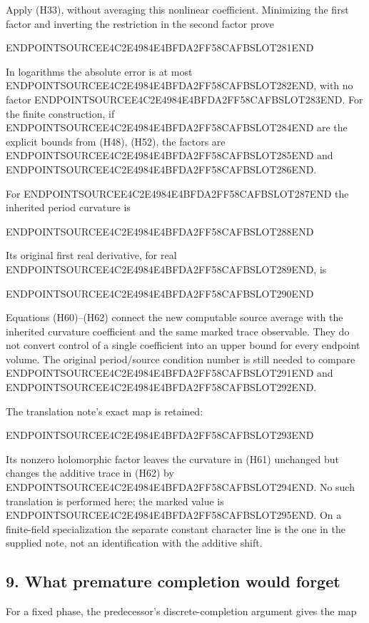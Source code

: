 Apply (H33), without averaging this nonlinear coefficient. Minimizing the first factor and inverting the restriction in the second factor prove

ENDPOINTSOURCEE4C2E4984E4BFDA2FF58CAFBSLOT281END

In logarithms the absolute error is at most ENDPOINTSOURCEE4C2E4984E4BFDA2FF58CAFBSLOT282END, with no factor ENDPOINTSOURCEE4C2E4984E4BFDA2FF58CAFBSLOT283END. For the finite construction, if ENDPOINTSOURCEE4C2E4984E4BFDA2FF58CAFBSLOT284END are the explicit bounds from (H48), (H52), the factors are ENDPOINTSOURCEE4C2E4984E4BFDA2FF58CAFBSLOT285END and ENDPOINTSOURCEE4C2E4984E4BFDA2FF58CAFBSLOT286END.

For ENDPOINTSOURCEE4C2E4984E4BFDA2FF58CAFBSLOT287END the inherited period curvature is

ENDPOINTSOURCEE4C2E4984E4BFDA2FF58CAFBSLOT288END

Its original first real derivative, for real ENDPOINTSOURCEE4C2E4984E4BFDA2FF58CAFBSLOT289END, is

ENDPOINTSOURCEE4C2E4984E4BFDA2FF58CAFBSLOT290END

Equations (H60)--(H62) connect the new computable source average with the inherited curvature coefficient and the same marked trace observable. They do not convert control of a single coefficient into an upper bound for every endpoint volume. The original period/source condition number is still needed to compare ENDPOINTSOURCEE4C2E4984E4BFDA2FF58CAFBSLOT291END and ENDPOINTSOURCEE4C2E4984E4BFDA2FF58CAFBSLOT292END.

The translation note's exact map is retained:

ENDPOINTSOURCEE4C2E4984E4BFDA2FF58CAFBSLOT293END

Its nonzero holomorphic factor leaves the curvature in (H61) unchanged but changes the additive trace in (H62) by ENDPOINTSOURCEE4C2E4984E4BFDA2FF58CAFBSLOT294END. No such translation is performed here; the marked value is ENDPOINTSOURCEE4C2E4984E4BFDA2FF58CAFBSLOT295END. On a finite-field specialization the separate constant character line is the one in the supplied note, not an identification with the additive shift.

\subsection{9. What premature completion would forget}\label{endpoint-holonomy_original--what-premature-completion-would-forget}

For a fixed phase, the predecessor's discrete-completion argument gives the map

